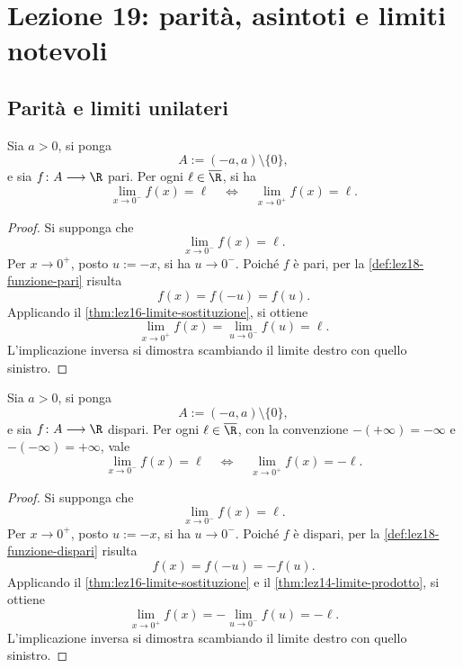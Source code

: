 \chapter[Lezione 19 --- 17 novembre 2026]{Lezione 19: parità, asintoti e limiti notevoli}
\label{chap:lezione-19}

\section{Parità e limiti unilateri}
\label{sec:lez19-parita-limiti}

\begin{proposition}
\label{prop:lez19-limiti-funzione-pari}
Sia \(a>0\), si ponga
\[
  A:=(-a,a)\setminus\{0\},
\]
e sia \(f\colon A\longrightarrow\R\) pari.
Per ogni \(\ell\in\overline{\R}\), si ha
\[
  \lim_{x\to0^-}f(x)=\ell
  \quad\Longleftrightarrow\quad
  \lim_{x\to0^+}f(x)=\ell.
\]
\end{proposition}

\begin{proof}
Si supponga che
\[
  \lim_{x\to0^-}f(x)=\ell.
\]
Per \(x\to0^+\), posto \(u:=-x\), si ha \(u\to0^-\).
Poiché \(f\) è pari, per la
\cref{def:lez18-funzione-pari} risulta
\[
  f(x)=f(-u)=f(u).
\]
Applicando il \cref{thm:lez16-limite-sostituzione},
si ottiene
\[
  \lim_{x\to0^+}f(x)
  =\lim_{u\to0^-}f(u)=\ell.
\]
L'implicazione inversa si dimostra scambiando
il limite destro con quello sinistro.
\end{proof}

\begin{proposition}
\label{prop:lez19-limiti-funzione-dispari}
Sia \(a>0\), si ponga
\[
  A:=(-a,a)\setminus\{0\},
\]
e sia \(f\colon A\longrightarrow\R\) dispari.
Per ogni \(\ell\in\overline{\R}\), con la convenzione
\(-(+\infty)=-\infty\) e \(-(-\infty)=+\infty\), vale
\[
  \lim_{x\to0^-}f(x)=\ell
  \quad\Longleftrightarrow\quad
  \lim_{x\to0^+}f(x)=-\ell.
\]
\end{proposition}

\begin{proof}
Si supponga che
\[
  \lim_{x\to0^-}f(x)=\ell.
\]
Per \(x\to0^+\), posto \(u:=-x\), si ha \(u\to0^-\).
Poiché \(f\) è dispari, per la
\cref{def:lez18-funzione-dispari} risulta
\[
  f(x)=f(-u)=-f(u).
\]
Applicando il \cref{thm:lez16-limite-sostituzione}
e il \cref{thm:lez14-limite-prodotto},
si ottiene
\[
  \lim_{x\to0^+}f(x)
  =-\lim_{u\to0^-}f(u)=-\ell.
\]
L'implicazione inversa si dimostra scambiando
il limite destro con quello sinistro.
\end{proof}

